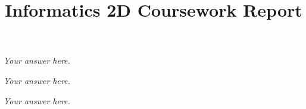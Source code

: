 \documentclass[answers]{exam}
\title{Informatics 2D Coursework Report}
\author{} %
\date{} %
\begin{document}
\maketitle
\begin{questions}
\begin{framed}
\emph{Your answer here.}
\end{framed}
\begin{framed}
\emph{Your answer here.}
\end{framed}
\begin{framed}
\emph{Your answer here.}
\end{framed}
\end{questions}
\end{document}
